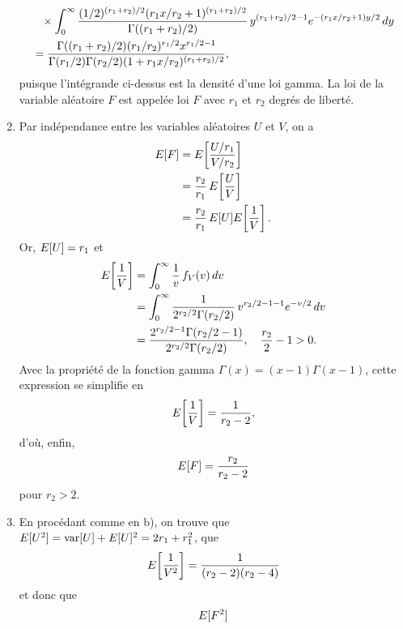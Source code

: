 \begin{solution}{2.13}
\begin{enumerate}
\begin{align*}
        &\phantom{=} \times
        \int_0^\infty
        \frac{(1/2)^{(r_1 + r_2)/2} (r_1 x/r_2 + 1)^{(r_1 + r_2)/2}}{%
          \Gamma((r_1 + r_2)/2)}\,
        y^{(r_1 + r_2)/2 - 1}
        e^{-(r_1 x/r_2 + 1) y/2}\, dy \\
        &= \frac{\Gamma((r_1 + r_2)/2) (r_1/r_2)^{r_1/2} x^{r_1/2 - 1}}{%
        \Gamma(r_1/2) \Gamma(r_2/2) (1 + r_1 x/r_2)^{(r_1 + r_2)/2}},
      \end{align*}
      puisque l'intégrande ci-dessus est la densité d'une loi gamma.
      La loi de la variable aléatoire $F$ est appelée loi $F$ avec
      $r_1$ et $r_2$ degrés de liberté.
    \item Par indépendance entre les variables aléatoires $U$ et $V$,
      on a
      \begin{align*}
        E [ F ] &= E\! \left[ \frac{U/r_1}{V/r_2} \right] \\
        &= \frac{r_2}{r_1}\, E\! \left[ \frac{U}{V} \right] \\
        &= \frac{r_2}{r_1}\, E [ U ] E\! \left[ \frac{1}{V} \right].
      \end{align*}
      Or, $E [ U ] = r_1$ et
      \begin{align*}
        \Esp{\frac{1}{V}}
        &= \int_0^\infty \frac{1}{v}\, f_V(v)\, dv \\
        &= \int_0^\infty
        \frac{1}{2^{r_2/2} \Gamma(r_2/2)}\,
        v^{r_2/2 - 1 - 1} e^{-v/2}\, dv \\
        &= \frac{2^{r_2/2 - 1} \Gamma(r_2/2 - 1)}{%
          2^{r_2/2} \Gamma(r_2/2)}, \quad
        \frac{r_2}{2} - 1 > 0.
      \end{align*}
      Avec la propriété de la fonction gamma $\Gamma(x) = (x - 1)
      \Gamma(x - 1)$, cette expression se simplifie en
      \begin{equation*}
        E\! \left[ \frac{1}{V} \right] = \frac{1}{r_2 - 2},
      \end{equation*}
      d'où, enfin,
      \begin{displaymath}
        E [ F ] = \frac{r_2}{r_2 - 2}
      \end{displaymath}
      pour $r_2 > 2$.
    \item En procédant comme en b), on trouve que $E [ U^2 ] = \mathrm{var} [ U ]
      + E [ U ]^2 = 2 r_1 + r_1^2$, que
      \begin{displaymath}
        E\! \left[ \frac{1}{V^2} \right] = \frac{1}{(r_2 - 2)(r_2 - 4)}
      \end{displaymath}
      et donc que
      \begin{align*}
        \esp{F^2}

\end{align*}
\end{enumerate}
\end{solution}
